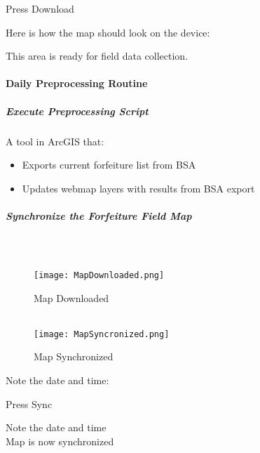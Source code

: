 \documentclass[class=article , crop=false, titlepage, twoside, multi={itemize, figure, verbatim}, float=false]{standalone}
\begin{document}
\noindent Press Download \\
\vspace{3in}

\noindent Here is how the map should look on the device:\\
\vspace{1in}

\noindent This area is ready for field data collection.
\clearpage


\paragraph{Daily Preprocessing Routine}

\subparagraph{Execute Preprocessing Script}A tool in ArcGIS that:

\begin{itemize}

\item Exports current forfeiture list from BSA
\item Updates webmap layers with results from BSA export


\end{itemize}

\clearpage
\subparagraph{Synchronize the Forfeiture Field Map\\}

\subparagraph*{\\}
\begin{wrapfigure}{r}{0.5\textwidth}
\centering
\texttt{[image: MapDownloaded.png]}
\caption{Map Downloaded}
\vspace{.25in}
\HRule \\[.4cm] %
\vspace{.25in}
\texttt{[image: MapSyncronized.png]}
\caption{Map Synchronized}
\end{wrapfigure}
Note the date and time:
\vspace{1.5in}

\noindent Press Sync
\vspace{1.5in}

Note the date and time\\

Map is now synchronized
\clearpage
\end{document}
